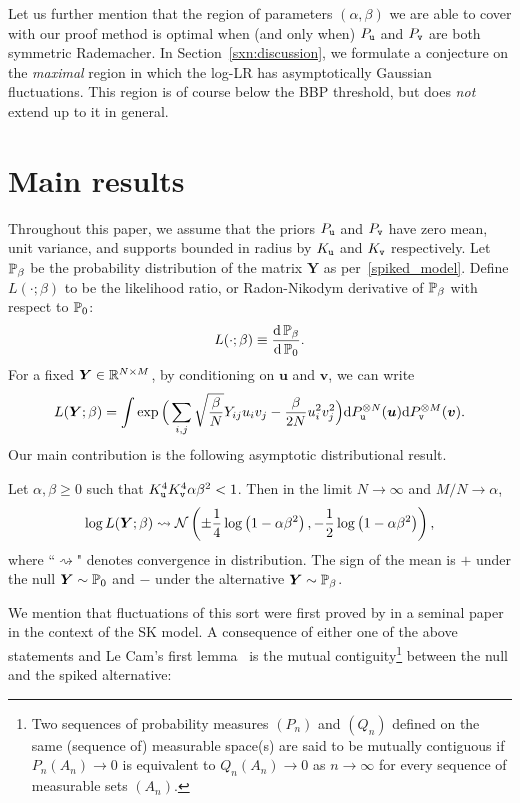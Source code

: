 \documentclass[final,12pt]{colt2018} %
\newcommand{\utt}{\textup{\texttt{u}}}
\newcommand{\vtt}{\textup{\texttt{v}}}
\renewcommand{\u}{\bm{u}}
\renewcommand{\v}{\bm{v}}
\newcommand{\Y}{\bm{Y}}
\begin{document}
Let us further mention that the region of parameters $(\alpha,\beta)$ we are able to cover with our proof method is optimal when (and only when) $P_{\utt}$  and $P_{\vtt}$ are both symmetric Rademacher. In Section~\ref{sxn:discussion}, we formulate a conjecture on the \emph{maximal} region in which the log-LR has asymptotically Gaussian fluctuations. This region is of course below the BBP threshold, but does \emph{not} extend up to it in general.   



 \section{Main results}
Throughout this paper, we assume that the priors $P_{\utt}$ and $P_{\vtt}$ have zero mean, unit variance, and supports bounded in radius by $K_{\utt}$ and $K_{\vtt}$ respectively. 
Let $\P_{\beta}$ be the probability distribution of the matrix $\Y$ as per~\eqref{spiked_model}. Define $L(\cdot;\beta)$ to be the likelihood ratio, or Radon-Nikodym derivative of $\P_{\beta}$ with respect to $\P_{0}$:
 \[L(\cdot;\beta) \equiv \frac{\rmd \P_{\beta}}{\rmd \P_{0}}.\]
For a fixed $\Y \in \R^{N \times M}$, by conditioning on $\u$ and $\v$, we can write
\[L(\Y;\beta) = \int \exp \Big(\sum_{i,j}\sqrt{\frac{\beta}{N}}Y_{ij}u_iv_j - \frac{\beta}{2N} u_i^2v_j^2\Big)\rmd P_{\utt}^{\otimes N}(\u)\rmd P_{\vtt}^{\otimes M}(\v).\]
 Our main contribution is the following asymptotic distributional result.
\begin{theorem}\label{fluctuations_main_theorem}
Let $\alpha,\beta \ge 0$ such that $K_{\utt}^4K_{\vtt}^4\alpha\beta^2<1$. Then in the limit $N \to \infty$ and $M/N \to \alpha$,
\[\log L(\Y;\beta) \rightsquigarrow \normal\left(\pm\frac{1}{4} \log \left(1-\alpha \beta^2\right),-\frac{1}{2} \log \left(1-\alpha \beta^2\right)\right), \]
where ``$\rightsquigarrow$" denotes convergence in distribution. The sign of the mean is $+$ under the null $\Y \sim \P_{0}$ and $-$ under the alternative $\Y \sim \P_{\beta}$.
\end{theorem}
We mention that fluctuations of this sort were first proved by \cite{aizenman1987some} in a seminal paper in the context of the SK model.
A consequence of either one of the above statements and Le Cam's first lemma~\citep[Lemma 6.4]{vandervaart2000asymptotic} is the mutual contiguity\footnote{Two sequences of probability measures $(P_n)$ and $(Q_n)$ defined on the same (sequence of) measurable space(s) are said to be mutually contiguous if $P_{n}(A_n) \to 0$ is equivalent to $Q_n(A_n) \to 0$ as $n \to \infty$ for every sequence of measurable sets $(A_n)$.}  between the null and the spiked alternative:
\end{document}

